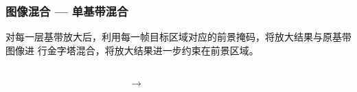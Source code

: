 \documentclass[xcolor=svgnames,serif,table]{beamer}
\begin{document}
\begin{frame}
  \frametitle{图像混合 --- 单基带混合}
  \small
  
  对每一层基带放大后，利用每一帧目标区域对应的前景掩码，将放大结果与原基带图像进
  行金字塔混合，将放大结果进一步约束在前景区域。
  
  \vspace{3em}

  \begin{columns}
    \begin{column}{.65\textwidth}
      \centering
      ~
      ~
    \end{column}

    \begin{column}{.1\textwidth}
      \centering
      \Huge $\rightarrow$
    \end{column}
    
    \begin{column}{.2\textwidth}
      \centering
    \end{column}
  \end{columns}

  \medskip
\end{frame}
\end{document}
